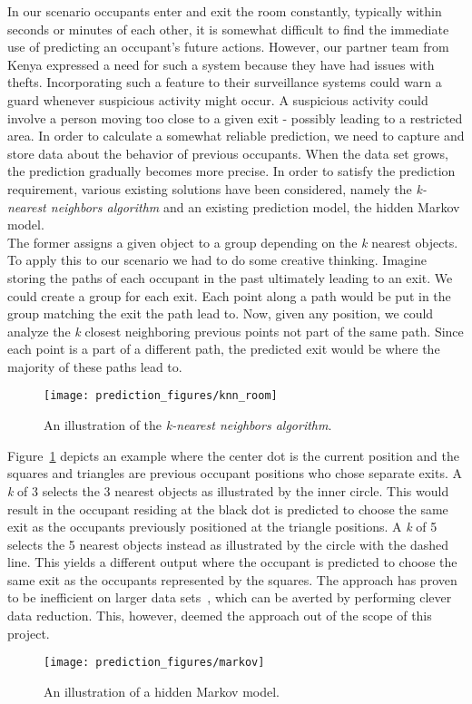 In our scenario occupants enter and exit the room constantly, typically within seconds or minutes of each other, it is somewhat difficult to find the immediate use of predicting an occupant's future actions. However, our partner team from Kenya expressed a need for such a system because they have had issues with thefts. Incorporating such a feature to their surveillance systems could warn a guard whenever suspicious activity might occur. A suspicious activity could involve a person moving too close to a given exit - possibly leading to a restricted area. In order to calculate a somewhat reliable prediction, we need to capture and store data about the behavior of previous occupants. When the data set grows, the prediction gradually becomes more precise. In order to satisfy the prediction requirement, various existing solutions have been considered, namely the \emph{k-nearest neighbors algorithm} and an existing prediction model, the hidden Markov model. \\
The former assigns a given object to a group depending on the \emph{k} nearest objects. To apply this to our scenario we had to do some creative thinking. Imagine storing the paths of each occupant in the past ultimately leading to an exit. We could create a group for each exit. Each point along a path would be put in the group matching the exit the path lead to. Now, given any position, we could analyze the \emph{k} closest neighboring previous points not part of the same path. Since each point is a part of a different path, the predicted exit would be where the majority of these paths lead to.
\begin{figure}[htb]
\centering
\texttt{[image: prediction\_figures/knn\_room]}
\caption{An illustration of the \emph{k-nearest neighbors algorithm}.}
\label{fig:knn}
\end{figure}
Figure~\ref{fig:knn} depicts an example where the center dot is the current position and the squares and triangles are previous occupant positions who chose separate exits. A \emph{k} of 3 selects the 3 nearest objects as illustrated by the inner circle. This would result in the occupant residing at the black dot is predicted to choose the same exit as the occupants previously positioned at the triangle positions. A \emph{k} of 5 selects the 5 nearest objects instead as illustrated by the circle with the dashed line. This yields a different output where the occupant is predicted to choose the same exit as the occupants represented by the squares. The approach has proven to be inefficient on larger data sets~\cite{bhatia}, which can be averted by performing clever data reduction. This, however, deemed the approach out of the scope of this project.
\begin{figure}[htb]
\centering
\texttt{[image: prediction\_figures/markov]}
\caption{An illustration of a hidden Markov model.}
\label{fig:markov}
\end{figure}

